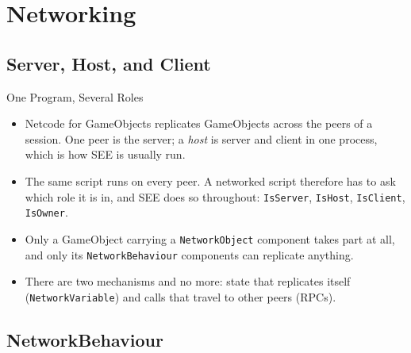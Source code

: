 
\section{Networking}


\subsection{Server, Host, and Client}

\begin{frame}{One Program, Several Roles}
  \begin{itemize}
    \item Netcode for GameObjects replicates GameObjects across the peers of a
      session. One peer is the server; a \emph{host} is server and client in one
      process, which is how SEE is usually run.
    \item The same script runs on every peer. A networked script therefore has
      to ask which role it is in, and SEE does so throughout:
      \texttt{IsServer}, \texttt{IsHost}, \texttt{IsClient},
      \texttt{IsOwner}.
    \item Only a GameObject carrying a \texttt{NetworkObject} component takes
      part at all, and only its \texttt{NetworkBehaviour} components can
      replicate anything.
    \item There are two mechanisms and no more: state that replicates itself
      (\texttt{NetworkVariable}) and calls that travel to other peers (RPCs).
  \end{itemize}
\end{frame}

\subsection{NetworkBehaviour}

